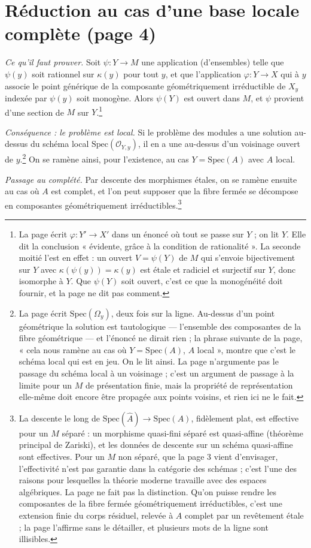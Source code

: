 \documentclass[11pt,a4paper]{article}
\begin{document}
\section*{Réduction au cas d'une base locale complète (page 4)}

\emph{Ce qu'il faut prouver.} Soit $\psi : Y \to M$ une application (d'ensembles)
telle que $\psi(y)$ soit rationnel sur $\kappa(y)$ pour tout $y$, et que
l'application $\varphi : Y \to X$ qui à $y$ associe le point générique de la
composante géométriquement irréductible de $X_y$ indexée par $\psi(y)$ soit
monogène. Alors $\psi(Y)$ est ouvert dans $M$, et $\psi$ provient d'une section
de $M$ sur $Y$.\footnote{La page écrit $\varphi : Y' \to X'$ dans un énoncé où
tout se passe sur $Y$ ; on lit $Y$. Elle dit la conclusion « évidente, grâce à
la condition de rationalité ». La seconde moitié l'est en effet : un ouvert
$V = \psi(Y)$ de $M$ qui s'envoie bijectivement sur $Y$ avec
$\kappa(\psi(y)) = \kappa(y)$ est étale et radiciel et surjectif sur $Y$, donc
isomorphe à $Y$. Que $\psi(Y)$ soit ouvert, c'est ce que la monogénéité doit
fournir, et la page ne dit pas comment.}

\emph{Conséquence : le problème est local.} Si le problème des modules a une
solution au-dessus du schéma local $\mathrm{Spec}(\mathcal{O}_{Y,y})$, il en a
une au-dessus d'un voisinage ouvert de $y$.\footnote{La page écrit
$\mathrm{Spec}(\Omega_y)$, deux fois sur la ligne. Au-dessus d'un point
géométrique la solution est tautologique --- l'ensemble des composantes de la
fibre géométrique --- et l'énoncé ne dirait rien ; la phrase suivante de la
page, « cela nous ramène au cas où $Y = \mathrm{Spec}(A)$, $A$ local », montre
que c'est le schéma local qui est en jeu. On le lit ainsi. La page n'argumente
pas le passage du schéma local à un voisinage ; c'est un argument de passage à
la limite pour un $M$ de présentation finie, mais la propriété de
représentation elle-même doit encore être propagée aux points voisins, et rien
ici ne le fait.} On se ramène ainsi, pour l'existence, au cas
$Y = \mathrm{Spec}(A)$ avec $A$ local.

\emph{Passage au complété.} Par descente des morphismes étales, on se ramène
ensuite au cas où $A$ est complet, et l'on peut supposer que la fibre fermée se
décompose en composantes géométriquement irréductibles.\footnote{La descente
le long de $\mathrm{Spec}(\widehat{A}) \to \mathrm{Spec}(A)$, fidèlement plat,
est effective pour un $M$ séparé : un morphisme quasi-fini séparé est
quasi-affine (théorème principal de Zariski), et les données de descente sur un
schéma quasi-affine sont effectives. Pour un $M$ non séparé, que la page 3
vient d'envisager, l'effectivité n'est pas garantie dans la catégorie des
schémas ; c'est l'une des raisons pour lesquelles la théorie moderne travaille
avec des espaces algébriques. La page ne fait pas la distinction. Qu'on puisse
rendre les composantes de la fibre fermée géométriquement irréductibles, c'est
une extension finie du corps résiduel, relevée à $A$ complet par un
revêtement étale ; la page l'affirme sans le détailler, et plusieurs mots de la
ligne sont illisibles.}
\end{document}
